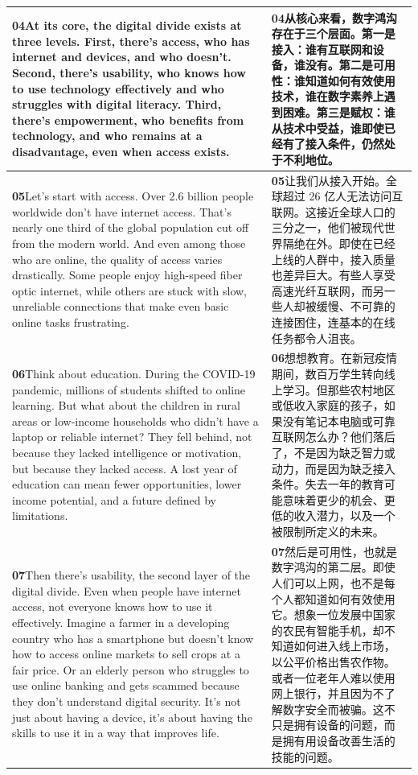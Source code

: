 \documentclass[UTF8,zihao=-4,fontset=fandol]{ctexart}
\newcommand{\TranscriptColumn}{\raggedright\arraybackslash\hyphenpenalty=10000\exhyphenpenalty=10000\sloppy}
\begin{document}
\begin{longtable}{>{\TranscriptColumn}p{} >{\TranscriptColumn}p{}}
\textbf{04}\quad At its core, the digital divide exists at three levels. First, there's access, who has internet and devices, and who doesn't. Second, there's usability, who knows how to use technology effectively and who struggles with digital literacy. Third, there's empowerment, who benefits from technology, and who remains at a disadvantage, even when access exists. & \textbf{04}\quad 从核心来看，数字鸿沟存在于三个层面。第一是接入：谁有互联网和设备，谁没有。第二是可用性：谁知道如何有效使用技术，谁在数字素养上遇到困难。第三是赋权：谁从技术中受益，谁即使已经有了接入条件，仍然处于不利地位。 \\ \hline
\textbf{05}\quad Let's start with access. Over 2.6 billion people worldwide don't have internet access. That's nearly one third of the global population cut off from the modern world. And even among those who are online, the quality of access varies drastically. Some people enjoy high-speed fiber optic internet, while others are stuck with slow, unreliable connections that make even basic online tasks frustrating. & \textbf{05}\quad 让我们从接入开始。全球超过 26 亿人无法访问互联网。这接近全球人口的三分之一，他们被现代世界隔绝在外。即使在已经上线的人群中，接入质量也差异巨大。有些人享受高速光纤互联网，而另一些人却被缓慢、不可靠的连接困住，连基本的在线任务都令人沮丧。 \\ \hline
\textbf{06}\quad Think about education. During the COVID-19 pandemic, millions of students shifted to online learning. But what about the children in rural areas or low-income households who didn't have a laptop or reliable internet? They fell behind, not because they lacked intelligence or motivation, but because they lacked access. A lost year of education can mean fewer opportunities, lower income potential, and a future defined by limitations. & \textbf{06}\quad 想想教育。在新冠疫情期间，数百万学生转向线上学习。但那些农村地区或低收入家庭的孩子，如果没有笔记本电脑或可靠互联网怎么办？他们落后了，不是因为缺乏智力或动力，而是因为缺乏接入条件。失去一年的教育可能意味着更少的机会、更低的收入潜力，以及一个被限制所定义的未来。 \\ \hline
\textbf{07}\quad Then there's usability, the second layer of the digital divide. Even when people have internet access, not everyone knows how to use it effectively. Imagine a farmer in a developing country who has a smartphone but doesn't know how to access online markets to sell crops at a fair price. Or an elderly person who struggles to use online banking and gets scammed because they don't understand digital security. It's not just about having a device, it's about having the skills to use it in a way that improves life. & \textbf{07}\quad 然后是可用性，也就是数字鸿沟的第二层。即使人们可以上网，也不是每个人都知道如何有效使用它。想象一位发展中国家的农民有智能手机，却不知道如何进入线上市场，以公平价格出售农作物。或者一位老年人难以使用网上银行，并且因为不了解数字安全而被骗。这不只是拥有设备的问题，而是拥有用设备改善生活的技能的问题。 \\ \hline

\end{longtable}
\end{document}
